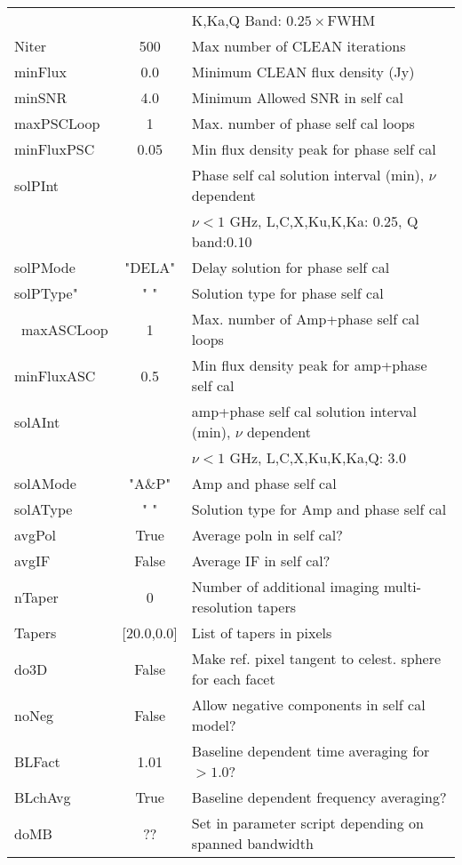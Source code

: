 \documentclass[11pt]{article}
\begin{document}
\begin{enumerate}
\begin{center}
\begin{tabular}{|l|c|l|}
            &          & K,Ka,Q Band: $0.25\times$FWHM\\
Niter       & 500      & Max number of CLEAN iterations\\
minFlux     & 0.0      & Minimum CLEAN flux density (Jy) \\
minSNR      & 4.0      & Minimum Allowed SNR in self cal\\
maxPSCLoop  & 1        & Max. number of phase self cal loops\\
minFluxPSC  & 0.05     & Min flux density peak for phase self cal\\
solPInt     &          & Phase self cal solution interval (min), $\nu$ dependent \\
            &          &       $\nu<1$ GHz, L,C,X,Ku,K,Ka: 0.25, Q band:0.10\\
solPMode    & "DELA"   & Delay solution for phase self cal\\
solPType"   & "    "   & Solution type for phase self cal\\\
maxASCLoop  & 1        & Max. number of Amp+phase self cal loops\\
minFluxASC  & 0.5      & Min flux density peak for amp+phase self cal\\
solAInt     &          & amp+phase self cal solution interval (min),
$\nu$ dependent\\
            &          & $\nu<1$ GHz, L,C,X,Ku,K,Ka,Q: 3.0\\
solAMode    & "A\&P"   & Amp and phase self cal \\
solAType    & "    "   & Solution type for Amp and phase self cal\\
avgPol      & True     & Average poln in self cal?\\
avgIF       & False    & Average IF in self cal?\\
nTaper      & 0        & Number of additional imaging multi-resolution tapers\\
Tapers      & [20.0,0.0] &  List of tapers in pixels\\
do3D        & False    & Make ref. pixel tangent to celest. sphere for each facet\\
noNeg       & False    & Allow negative components in self cal model?\\
BLFact      & 1.01     & Baseline dependent time averaging for $>1.0$?\\
BLchAvg     & True     & Baseline dependent frequency averaging?\\
doMB        &  ??      & Set in parameter script depending on spanned bandwidth\\

\end{tabular}
\end{center}
\end{enumerate}
\end{document}
